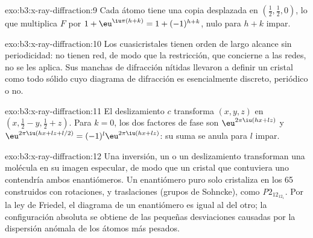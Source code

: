 \begin{solution}{exo:b3:x-ray-diffraction:9}
Cada átomo tiene una copia desplazada en $(\frac12,\frac12,0)$, lo que multiplica $F$ por $1 +
\eu^{\iu\pi(h+k)} = 1 + (-1)^{h+k}$, nulo para $h + k$ impar.
\end{solution}

\begin{solution}{exo:b3:x-ray-diffraction:10}
Los cuasicristales tienen orden de largo alcance sin periodicidad: no tienen
red, de modo que la restricción, que concierne a las redes, no se les aplica.
Sus manchas de difracción nítidas llevaron a definir un cristal como todo sólido cuyo
diagrama de difracción es esencialmente discreto, periódico o no.
\end{solution}

\begin{solution}{exo:b3:x-ray-diffraction:11}
El deslizamiento $c$ transforma $(x, y, z)$ en $(x, \frac12 - y, \frac12 + z)$. Para $k = 0$, los dos
factores de fase son $\eu^{2\pi\iu(hx + lz)}$ y $\eu^{2\pi\iu(hx + lz + l/2)} = (-1)^l
\eu^{2\pi\iu(hx+lz)}$: su suma se anula para $l$ impar.
\end{solution}

\begin{solution}{exo:b3:x-ray-diffraction:12}
Una inversión, un  o un deslizamiento transforman una molécula en su imagen especular, de modo que un
cristal que contuviera uno contendría ambos enantiómeros. Un enantiómero puro
solo cristaliza en los 65  construidos con rotaciones, 
y traslaciones (grupos de Sohncke), como \textit{P}$2_12_12_1$. Por la ley de Friedel, el
diagrama de un enantiómero es igual al del otro; la configuración
absoluta se obtiene de las pequeñas desviaciones causadas por la dispersión anómala
de los átomos más pesados.
\end{solution}


